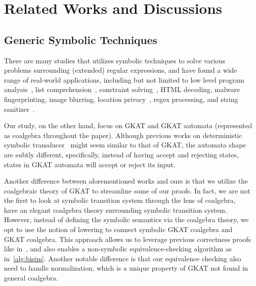\documentclass[conference]{IEEEtran}
\begin{document}
\section{Related Works and Discussions}

\subsection{Generic Symbolic Techniques}

There are many studies that utilizes symbolic techniques to solve various problems surrounding (extended) regular expressions, and have found a wide range of real-world applications, including but not limited to low level program analysis~\cite{dallapreda_AbstractSymbolicAutomata_2015a}, list comprehension~\cite{saarikivi_FusingEffectfulComprehensions_2017}, constraint solving~\cite{stanford_SymbolicBooleanDerivatives_2021}, HTML decoding, malware fingerprinting, image blurring, location privacy~\cite{veanes_SymbolicFiniteState_2012}, regex processing, and string sanitizer~\cite{veanes_ApplicationsSymbolicFinite_2013}.

Our study, on the other hand,  focus on GKAT and GKAT automata (represented as coalgebra throughout the paper). 
Although previous works on deterministic symbolic transducer~\cite{saarikivi_FusingEffectfulComprehensions_2017,veanes_SymbolicFiniteState_2012} might seem similar to that of GKAT, the automata shape are subtly different, specifically, instead of having accept and rejecting states, states in GKAT automata will accept or reject its input.

Another difference between aforementioned works and ours is that we utilize the coalgebraic theory of GKAT to streamline some of our proofs.
In fact, we are not the first to look at symbolic transition system through the lens of coalgebra, \citeauthor{bonchi_CoalgebraicSymbolicSemantics_2009}~\cite{bonchi_CoalgebraicSymbolicSemantics_2009} have an elegant coalgebra theory surrounding symbolic transition system.
However, instead of defining the symbolic semantics via the coalgebra theory, we opt to use the notion of lowering to connect symbolic GKAT coalgebra and GKAT coalgebra.
This approach allows us to leverage previous correctness proofs like in~, and also enables a non-symbolic equivalence-checking algorithm as in~\cref{alg:bisim}.
Another notable difference is that our equivalence checking also need to handle normalization, which is a unique property of GKAT not found in general coalgebra.
\end{document}
